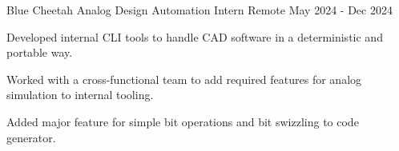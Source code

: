   \begin{cventry}
    {Blue Cheetah Analog} %
    {Design Automation Intern} %
    {Remote} %
    {May 2024 - Dec 2024} %
    {
      \begin{cvitems} %
        \item {
        Developed internal CLI tools to handle CAD software in a deterministic and portable way.
        }
        \item {
        Worked with a cross-functional team to add required features for analog simulation to internal tooling.
        }
        \item {
        Added major feature for simple bit operations and bit swizzling to code generator.
        }
      \end{cvitems}
    }
  \end{cventry}
